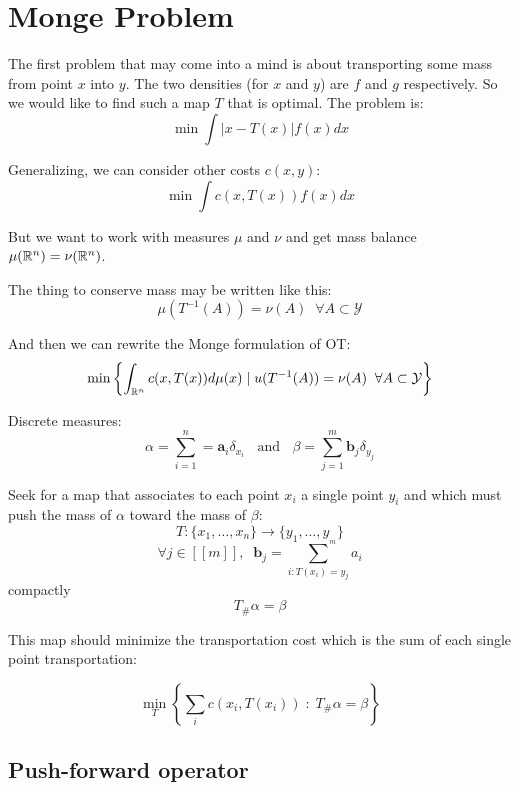 \section{Monge Problem}

The first problem that may come into a mind is about transporting some mass from point $x$ into $y$.
The two densities (for $x$ and $y$) are $f$ and $g$ respectively. So we would like to find such
a map $T$ that is optimal.
The problem is:
\[ \min \int \left| x - T(x) \right| f(x) dx \]

Generalizing, we can consider other costs $c(x, y)$:
\[ \min \int c(x, T(x)) f(x) dx \]

But we want to work with measures $\mu$ and $\nu$
and get mass balance $\mu(\mathbb{R}^{n}) = \nu(\mathbb{R}^{n})$.

The thing to conserve mass may be written like this:
\[ \mu(T^{-1}(A)) = \nu(A) \;\; \forall A \subset \mathcal{Y} \] 

And then we can rewrite the Monge formulation of OT:
\[ \min \left\{ \int_{\mathbb{R}^{n}} c(x, T(x)) d\mu(x) \mid u(T^{-1}(A)) = \nu(A) \;\; \forall A \subset \mathcal{Y} \right\} \]

\hr

Discrete measures:
$$
\alpha = \sum_{i = 1}^{n} = \mathbf{a}_{i} \delta_{x_{i}}
\;\; \text{ and } \;\;
\beta = \sum_{j=1}^{m} \mathbf{b}_{j} \delta _{y_{j}}
$$

Seek for a map that associates to each point $x_{i}$ a single point $y_{i}$ and which must push the mass of $\alpha$ toward the mass of $\beta$:
$$
T: \{ x_{1}, \dots, x_{n} \} \to \{ y_{1}, \dots, y_{_{m}} \}
$$
$$
\forall j \in [[ m ]], \;\; \mathbf{b}_{j} = \sum_{i: T(x_{i}) = y_{j}} a_{i}
$$
compactly
$$
T_{\#} \alpha = \beta
$$

This map should minimize the transportation cost which is the sum of each single point transportation:

$$
\min_{T} \left\{ \sum_{i} c( x_{i}, T(x_{i}) )
\; : \;
T_{\#} \alpha = \beta \right\}
$$

\subsection{Push-forward operator}

\todo{}
